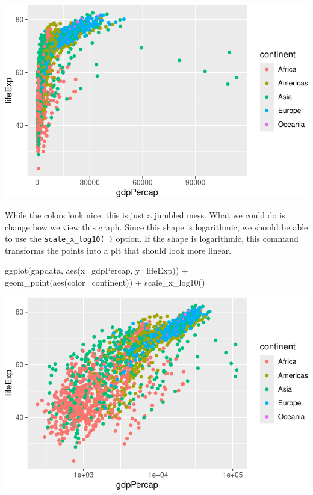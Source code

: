 \documentclass[
  letterpaper,
  DIV=11,
  numbers=noendperiod]{scrreprt}
\newenvironment{Shaded}{\begin{snugshade}}{\end{snugshade}}
\newcommand{\AttributeTok}[1]{\textcolor[rgb]{0.40,0.45,0.13}{#1}}
\newcommand{\FunctionTok}[1]{\textcolor[rgb]{0.28,0.35,0.67}{#1}}
\newcommand{\NormalTok}[1]{\textcolor[rgb]{0.00,0.23,0.31}{#1}}
\newcommand{\SpecialCharTok}[1]{\textcolor[rgb]{0.37,0.37,0.37}{#1}}
\begin{document}
\includegraphics{Advanced_Scatterplot_Techniques_files/figure-pdf/unnamed-chunk-15-1.pdf}

While the colors look nice, this is just a jumbled mess. What we could
do is change how we view this graph. Since this shape is logarithmic, we
should be able to use the \texttt{scale\_x\_log10(\ )} option. If the
shape is logarithmic, this command transforms the points into a plt that
should look more linear.

\begin{Shaded}
\begin{Highlighting}[]
  \FunctionTok{ggplot}\NormalTok{(gapdata, }\FunctionTok{aes}\NormalTok{(}\AttributeTok{x=}\NormalTok{gdpPercap, }\AttributeTok{y=}\NormalTok{lifeExp)) }\SpecialCharTok{+}
  \FunctionTok{geom\_point}\NormalTok{(}\FunctionTok{aes}\NormalTok{(}\AttributeTok{color=}\NormalTok{continent)) }\SpecialCharTok{+}
  \FunctionTok{scale\_x\_log10}\NormalTok{()}
\end{Highlighting}
\end{Shaded}

\includegraphics{Advanced_Scatterplot_Techniques_files/figure-pdf/unnamed-chunk-16-1.pdf}
\end{document}
